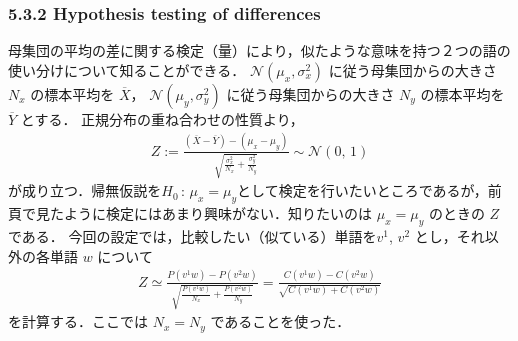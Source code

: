 \documentclass[10pt,leqno]{beamer}
\begin{document}
\begin{frame}
    \frametitle{5.3.2 Hypothesis testing of differences}
    母集団の平均の差に関する検定（量）により，似たような意味を持つ２つの語の使い分けについて知ることができる．
    $\mathcal{N}(\mu_x, \sigma_x^2)$ に従う母集団からの大きさ $N_x$ の標本平均を $\overline{X}$，
    $\mathcal{N}(\mu_y, \sigma_y^2)$ に従う母集団からの大きさ $N_y$ の標本平均を $\overline{Y}$ とする．
    正規分布の重ね合わせの性質より，
    \begin{align*}
        Z := \frac{\left(\overline{X} - \overline{Y}\right) - \left(\mu_x - \mu_y \right)}{{\displaystyle \sqrt{\frac{\sigma_x^2}{N_x} + \frac{\sigma_y^2}{N_y}}}} \sim \mathcal{N}(0,\,1)
    \end{align*}
    が成り立つ．帰無仮説を$H_0 \,:\, \mu_x = \mu_y$として検定を行いたいところであるが，前頁で見たように検定にはあまり興味がない．知りたいのは $\mu_x = \mu_y$ のときの $Z$ である．
    今回の設定では，比較したい（似ている）単語を$v^1$, $v^2$ とし，それ以外の各単語 $w$ について
    \begin{align*}
        Z \simeq \frac{P\left(v^1 w\right) - P\left(v^2 w\right)}{{\displaystyle \sqrt{\frac{P\left(v^1 w\right)}{N_x} + \frac{P\left(v^2 w\right)}{N_y}}}}
        = \frac{C\left(v^1 w\right) - C\left(v^2 w\right)}{\sqrt{C\left(v^1 w\right) + C\left(v^2 w\right)}}
    \end{align*}
    を計算する．ここでは $N_x = N_y$ であることを使った．

\end{frame}
\end{document}
